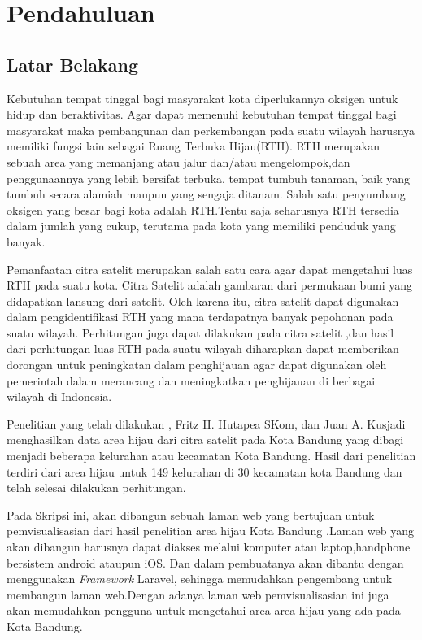 \chapter{Pendahuluan}
\label{chap:intro}

\section{Latar Belakang}
\label{sec:label}

Kebutuhan tempat tinggal bagi masyarakat kota diperlukannya oksigen untuk hidup dan beraktivitas. Agar dapat memenuhi kebutuhan tempat tinggal bagi masyarakat maka pembangunan dan perkembangan pada suatu wilayah harusnya memiliki fungsi lain sebagai Ruang Terbuka Hijau(RTH). RTH merupakan sebuah area yang memanjang atau jalur dan/atau mengelompok,dan penggunaannya yang lebih bersifat terbuka, tempat tumbuh tanaman, baik yang tumbuh secara alamiah maupun yang sengaja ditanam. Salah satu penyumbang oksigen yang besar bagi kota adalah RTH.Tentu saja seharusnya RTH tersedia dalam jumlah yang cukup, terutama pada kota yang memiliki penduduk yang banyak.

Pemanfaatan citra satelit merupakan salah satu cara agar dapat mengetahui luas RTH pada suatu kota. Citra Satelit adalah gambaran dari permukaan bumi yang didapatkan lansung dari satelit. Oleh karena itu, citra satelit dapat digunakan dalam pengidentifikasi RTH yang mana terdapatnya banyak pepohonan pada suatu wilayah. Perhitungan juga dapat dilakukan pada citra satelit ,dan hasil dari perhitungan luas RTH pada suatu wilayah diharapkan dapat memberikan dorongan untuk peningkatan dalam penghijauan agar dapat digunakan oleh pemerintah dalam merancang dan meningkatkan penghijauan di berbagai wilayah di Indonesia.

Penelitian yang telah dilakukan \VSM, Fritz H. Hutapea SKom, dan Juan A. Kusjadi
menghasilkan data area hijau dari citra satelit pada Kota Bandung yang dibagi menjadi beberapa kelurahan atau kecamatan Kota Bandung. Hasil dari penelitian terdiri dari area hijau untuk 149 kelurahan di 30 kecamatan kota Bandung dan telah selesai dilakukan perhitungan.

Pada Skripsi ini, akan dibangun sebuah laman web yang bertujuan untuk pemvisualisasian dari hasil penelitian area hijau Kota Bandung
.Laman web yang akan dibangun harusnya dapat diakses melalui komputer atau laptop,handphone bersistem android ataupun iOS. Dan dalam pembuatanya akan dibantu dengan menggunakan \emph{Framework} Laravel, sehingga memudahkan pengembang untuk membangun laman web.Dengan adanya laman web pemvisualisasian ini juga akan memudahkan pengguna untuk mengetahui area-area hijau yang ada pada Kota Bandung.

